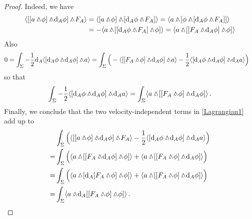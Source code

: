 \documentclass[12pt]{amsart}
\theoremstyle{plain}
\theoremstyle{definition}
\theoremstyle{remark}
\newcommand{\wed}{\wedge\hspace*{-7.5pt}.\hspace*{3pt}}
\numberwithin{equation}{section}  %
\begin{document}
\begin{proof}
Indeed, we have
\begin{align*}
\langle [[ a\wed \phi]\wed \mathrm{d}_A\phi]\wed F_A \rangle&=\langle [ a\wed\phi ] \wed [ \mathrm{d}_A\phi\wed F_A]\rangle = \langle  a\wed[\phi \wed [\mathrm{d}_A \phi\wed F_A]]\rangle\\
&=-\langle a\wed[[\mathrm{d}_A\phi\wed F_A]\wed\phi] \rangle=\langle a\wed[[F_A\wed \mathrm{d}_A\phi]\wed\phi] \rangle
\end{align*}
Also
\begin{align*}
0=\int_\Sigma -\frac{1}{2}\mathrm{d}_A\langle [\mathrm{d}_A\phi\wed \mathrm{d}_A\phi]\wed a   \rangle&=\int_\Sigma \Big( -\langle[[F_A\wed \phi]\wed \mathrm{d}_A\phi ]\wed a \rangle-\frac{1}{2}\langle[\mathrm{d}_A\phi\wed \mathrm{d}_A\phi]\wed \mathrm{d}_A a\rangle  \Big)
\end{align*}
so that
\[
\int_\Sigma -\frac{1}{2}\langle[\mathrm{d}_A\phi\wed \mathrm{d}_A\phi]\wed \mathrm{d}_A a\rangle=\int_\Sigma\langle a\wed[[F_A\wed \phi]\wed \mathrm{d}_A\phi]\rangle\,.
\]
Finally, we conclude that the two velocity-independent terms in \eqref{Lagrangian1} add up to
\begin{align*}
&\int_\Sigma \Big(\langle [[a\wed \phi]\wed \mathrm{d}_A\phi]\wed F_A\rangle-\frac{1}{2}\langle  [\mathrm{d}_A\phi \wed \mathrm{d}_A\phi]\wed \mathrm{d}_A a \rangle\Big)\\
=&\int_\Sigma\Big(\langle a\wed[[F_A\wed \mathrm{d}_A\phi]\wed \phi]\rangle+\langle a\wed[[F_A\wed\phi]\wed \mathrm{d}_A\phi]  \rangle\Big)\\
=&\int_\Sigma\Big(\langle a\wed[\mathrm{d}_A[F_A\wed\phi]\wed \phi]\rangle+\langle a\wed[[F_A\wed\phi]\wed \mathrm{d}_A\phi]  \rangle\Big)\\
=&\int_\Sigma \langle a\wed \mathrm{d}_A[[F_A\wed \phi]\wed \phi]\rangle\,.
\end{align*}    
\end{proof}
\end{document}
